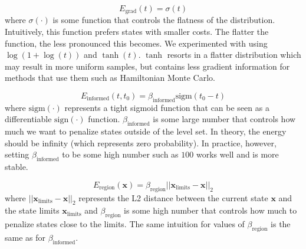 \documentclass[letterpaper, 10 pt, conference]{ieeeconf}  %
\begin{document}
{\begin{equation}
E_{\text{grad}}\left(t\right) = \sigma\left(t\right)
\end{equation}
where $\sigma\left(\cdot\right)$ is some function that controls the flatness of the distribution.  Intuitively, this function prefers states with smaller costs. The flatter the function, the less pronounced this becomes. We experimented with using $\log\left(1 + \log\left(t\right)\right)$ and $\tanh\left(t\right)$. $\tanh$ resorts in a flatter distribution which may result in more uniform samples, but contains less gradient information for methods that use them such as Hamiltonian Monte Carlo.

\begin{equation}
E_{\text{informed}}\left(t,t_0\right) = \beta_{\text{informed}} \text{sigm}\left(t_0 - t\right)
\end{equation}
where $\text{sigm}\left(\cdot\right)$ represents a tight sigmoid function that can be seen as a differentiable $\text{sign}\left(\cdot\right)$ function. $\beta_{\text{informed}}$ is some large number that controls how much we want to penalize states outside of the level set. In theory, the energy should be infinity (which represents zero probability). In practice, however, setting $\beta_{\text{informed}}$ to be some high number such as $100$ works well and is more stable.

\begin{equation}
E_{\text{region}}\left(\mathbf{x}\right) = \beta_{\text{region}}||\mathbf{x}_{\text{limits}} - \mathbf{x}||_2
\end{equation}
where $||\mathbf{x}_{\text{limits}} - \mathbf{x}||_2$ represents the L2 distance between the current state $\mathbf{x}$ and the state limits $\mathbf{x}_{\text{limits}}$ and $\beta_{\text{region}}$ is some high number that controls how much to penalize states close to the limits. The same intuition for values of $\beta_{\text{region}}$ is the same as for $\beta_{\text{informed}}$.

}








%
\end{document}
